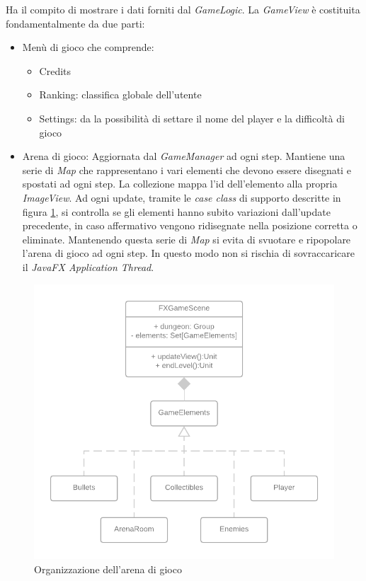 Ha il compito di mostrare i dati forniti dal \textit{GameLogic}. 
La \textit{GameView} è costituita fondamentalmente da due parti:

\begin{itemize}
    \item Menù di gioco che comprende:
    \begin{itemize}
        \item Credits
        \item Ranking: classifica globale dell'utente
        \item Settings: da la possibilità di settare il nome del player e la difficoltà di gioco
    \end{itemize}
    \item Arena di gioco: Aggiornata dal \textit{GameManager} ad ogni step. Mantiene una serie di \textit{Map} che rappresentano i vari elementi che devono essere disegnati e spostati ad ogni step. La collezione mappa l'id dell'elemento alla propria \textit{ImageView}. Ad ogni update, tramite le \textit{case class} di supporto descritte in figura \ref{view}, si controlla se gli elementi hanno subito variazioni dall'update precedente, in caso affermativo vengono ridisegnate nella posizione corretta o eliminate.
    Mantenendo questa serie di \textit{Map} si evita di svuotare e ripopolare l'arena di gioco ad ogni step. In questo modo non si rischia di sovraccaricare il \textit{JavaFX Application Thread}.
\end{itemize}

\begin{figure}[H]
  \includegraphics[width=13cm]{res/VIEW_Diagram.png}
  \caption{Organizzazione dell'arena di gioco}
  \label{view}
\end{figure}